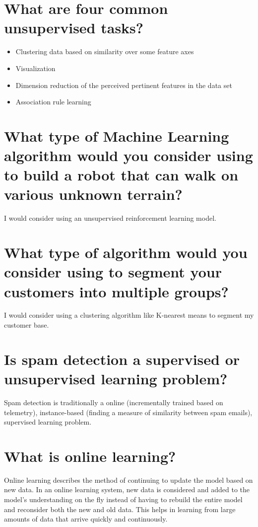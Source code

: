 \documentclass[letterpaper,12pt]{article}
\begin{document}
	\section{What are four common unsupervised tasks?}
	\begin{itemize}[leftmargin=*]
		\item Clustering data based on similarity over some feature axes
		\item Visualization
		\item Dimension reduction of the perceived pertinent features in the data set
		\item Association rule learning
	\end{itemize}

	\section{What type of Machine Learning algorithm would you consider using to build a robot that can walk on various unknown terrain?}
	I would consider using an unsupervised reinforcement learning model.
	
	\section{What type of algorithm would you consider using to segment your customers into multiple groups?}
	I would consider using a clustering algorithm like K-nearest means to segment my customer base.
	
	\section{Is spam detection a supervised or unsupervised learning problem?}
	Spam detection is traditionally a online (incrementally trained based on telemetry), instance-based (finding a measure of similarity between spam emails), supervised learning problem.
	
	\section{What is online learning?}
	Online learning describes the method of continuing to update the model based on new data. In an online learning system, new data is considered and added to the model's understanding on the fly instead of having to rebuild the entire model and reconsider both the new and old data. This helps in learning from large amounts of data that arrive quickly and continuously.
	
\end{document}
